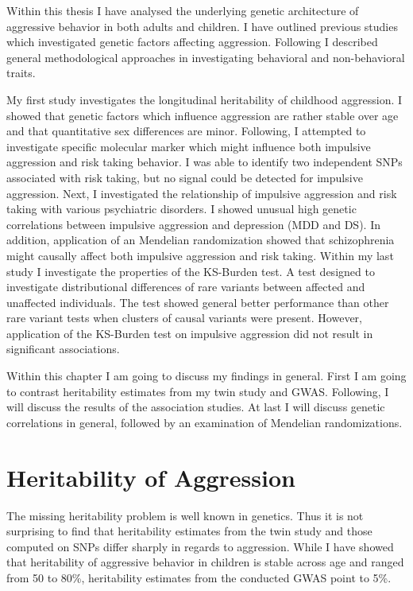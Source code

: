 

Within this thesis I have analysed the underlying genetic architecture of aggressive behavior in both adults and children.
I have outlined previous studies which investigated genetic factors affecting aggression.
Following I described general methodological approaches in investigating behavioral and non-behavioral traits.

My first study investigates the longitudinal heritability of childhood aggression.
I showed that genetic factors which influence aggression are rather stable over age and that quantitative sex differences are minor.
Following, I attempted to investigate specific molecular marker which might influence both impulsive aggression and risk taking behavior.
I was able to identify two independent SNPs associated with risk taking, but no signal could be detected for impulsive aggression.
Next, I investigated the relationship of impulsive aggression and risk taking with various psychiatric disorders.
I showed unusual high genetic correlations between impulsive aggression and depression (MDD and DS).
In addition, application of an Mendelian randomization showed that schizophrenia might causally affect both impulsive aggression and risk taking.
Within my last study I investigate the properties of the KS-Burden test.
A test designed to investigate distributional differences of rare variants between affected and unaffected individuals.
The test showed general better performance than other rare variant tests when clusters of causal variants were present.
However, application of the KS-Burden test on impulsive aggression did not result in significant associations.

Within this chapter I am going to discuss my findings in general.
First I am going to contrast heritability estimates from  my twin study and GWAS\@.
Following, I will discuss the results of the association studies.
At last I will discuss genetic correlations in general, followed by an examination of Mendelian randomizations.

\section{Heritability of Aggression}
\label{sec:heritability_of_aggression}

The missing heritability problem is well known in genetics.
Thus it is not surprising to find that heritability estimates from the twin study and those computed on SNPs differ sharply in regards to aggression.
While I have showed that heritability of aggressive behavior in children is stable across age and ranged from 50 to 80\%, heritability estimates from the conducted GWAS point to 5\%. 

